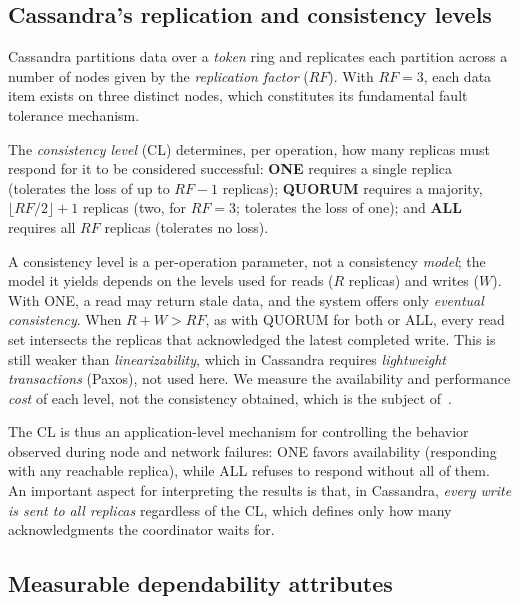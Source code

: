 \documentclass[runningheads]{llncs}
\begin{document}
\subsection{Cassandra's replication and consistency levels}

Cassandra partitions data over a \emph{token} ring and replicates each partition
across a number of nodes given by the \emph{replication factor} ($RF$). With $RF=3$, each data item exists on three distinct nodes,
which constitutes its fundamental fault tolerance mechanism.

The \emph{consistency level} (CL) determines, per operation, how many replicas
must respond for it to be considered successful: \textbf{ONE} requires a single
replica (tolerates the loss of up to $RF-1$ replicas);
\textbf{QUORUM} requires a majority, $\lfloor RF/2 \rfloor + 1$ replicas (two,
for $RF=3$; tolerates the loss of one); and \textbf{ALL} requires all $RF$
replicas (tolerates no loss).

A consistency level is a per-operation parameter, not a consistency
\emph{model}; the model it yields depends on the levels used for reads ($R$
replicas) and writes ($W$). With ONE, a read may return stale data, and the
system offers only \emph{eventual consistency}. When $R+W>RF$, as with QUORUM
for both or ALL, every read set intersects the replicas that acknowledged the
latest completed write. This is still weaker than \emph{linearizability}, which
in Cassandra requires \emph{lightweight transactions} (Paxos), not used here. We
measure the availability and performance \emph{cost} of each level, not the
consistency obtained, which is the subject of~\cite{rahman2012,jepsen}.

The CL is thus an application-level mechanism for controlling the behavior
observed during node and network failures: ONE favors availability (responding
with any reachable replica), while ALL refuses to respond without all of them. An important aspect for interpreting the results is that,
in Cassandra, \emph{every write is sent to all replicas} regardless of the CL,
which defines only how many acknowledgments the coordinator waits for.

\subsection{Measurable dependability attributes}
\end{document}
